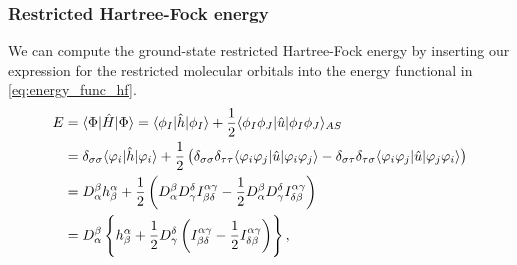             \subsubsection{Restricted Hartree-Fock energy}
                We can compute the ground-state restricted Hartree-Fock energy
                by inserting our expression for the restricted molecular
                orbitals into the energy functional in
                \autoref{eq:energy_func_hf}.
                \begin{align}
                    E
                    &= \langle \Phi |\hat{H}| \Phi \rangle
                    = \langle \phi_I |\hat{h}| \phi_I \rangle
                    + \frac{1}{2}
                    \langle \phi_I\phi_J |
                    \hat{u}
                    | \phi_I\phi_J \rangle_{AS}
                    \\
                    &=
                    \delta_{\sigma\sigma}
                    \langle \varphi_i |\hat{h}| \varphi_i \rangle
                    + \frac{1}{2}\left( 
                        \delta_{\sigma\sigma}\delta_{\tau\tau}
                        \langle \varphi_i\varphi_j |
                        \hat{u}
                        | \varphi_i\varphi_j \rangle
                        - \delta_{\sigma\tau}\delta_{\tau\sigma}
                        \langle \varphi_i\varphi_j |
                        \hat{u}
                        | \varphi_j\varphi_i \rangle
                     \right)
                    \\
                    &=
                    D^{\beta}_{\alpha}
                    h^{\alpha}_{\beta}
                    + \frac{1}{2}\left( 
                        D^{\beta}_{\alpha}
                        D^{\delta}_{\gamma}
                        I^{\alpha\gamma}_{\beta\delta}
                        - \frac{1}{2}
                        D^{\beta}_{\alpha}
                        D^{\delta}_{\gamma}
                        I^{\alpha\gamma}_{\delta\beta}
                     \right)
                    \\
                    &=
                    D^{\beta}_{\alpha}
                    \left\{ 
                        h^{\alpha}_{\beta}
                        + \frac{1}{2} D^{\delta}_{\gamma}
                        \left( 
                            I^{\alpha\gamma}_{\beta\delta}
                            - \frac{1}{2}
                            I^{\alpha\gamma}_{\delta\beta}
                         \right)
                     \right\},
                \end{align}

